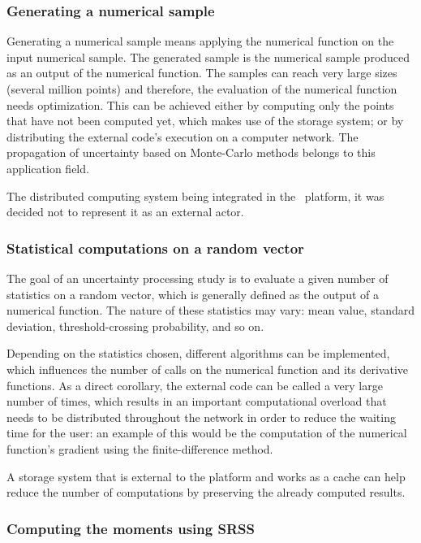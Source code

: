 \subsubsection{Generating a numerical sample}

Generating a numerical sample means applying the numerical function on the input numerical sample. The generated sample is the numerical sample produced as an output of the numerical function. The samples can reach very large sizes (several million points) and therefore, the evaluation of the numerical function needs optimization. This can be achieved either by computing only the points that have not been computed yet, which makes use of the storage system; or by distributing the external code's execution on a computer network. The propagation of uncertainty based on Monte-Carlo methods belongs to this application field.

The distributed computing system being integrated in the \OT\ platform, it was decided not to represent it as an external actor.

\subsubsection{Statistical computations on a random vector}

The goal of an uncertainty processing study is to evaluate a given number of statistics on a random vector, which is generally defined as the output of a numerical function. The nature of these statistics may vary: mean value, standard deviation, threshold-crossing probability, and so on.

Depending on the statistics chosen, different algorithms can be implemented, which influences the number of calls on the numerical function and its derivative functions. As a direct corollary, the external code can be called a very large number of times, which results in an important computational overload that needs to be distributed throughout the network in order to reduce the waiting time for the user: an example of this would be the computation of the numerical function's gradient using the finite-difference method.

A storage system that is external to the platform and works as a cache can help reduce the number of computations by preserving the already computed results.

\subsubsection{Computing the moments using SRSS}

